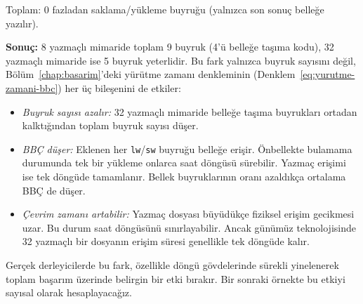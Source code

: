 \begin{ornek}[3.3]
Toplam: 0 fazladan saklama/yükleme buyruğu (yalnızca son sonuç belleğe yazılır).

\medskip
\textbf{Sonuç:} 8 yazmaçlı mimaride toplam 9 buyruk (4'ü belleğe taşıma kodu), 32 yazmaçlı mimaride ise 5 buyruk yeterlidir. Bu fark yalnızca buyruk sayısını değil, Bölüm~\ref{chap:basarim}'deki yürütme zamanı denkleminin (Denklem~\ref{eq:yurutme-zamani-bbc}) her üç bileşenini de etkiler:

\begin{itemize}[nosep]
\item \emph{Buyruk sayısı azalır:} 32 yazmaçlı mimaride belleğe taşıma buyrukları ortadan kalktığından toplam buyruk sayısı düşer.
\item \emph{BBÇ düşer:} Eklenen her \texttt{lw}/\texttt{sw} buyruğu belleğe erişir. Önbellekte bulamama durumunda tek bir yükleme onlarca saat döngüsü sürebilir. Yazmaç erişimi ise tek döngüde tamamlanır. Bellek buyruklarının oranı azaldıkça ortalama BBÇ de düşer.
\item \emph{Çevrim zamanı artabilir:} Yazmaç dosyası büyüdükçe fiziksel erişim gecikmesi uzar. Bu durum saat döngüsünü sınırlayabilir. Ancak günümüz teknolojisinde 32 yazmaçlı bir dosyanın erişim süresi genellikle tek döngüde kalır.
\end{itemize}

Gerçek derleyicilerde bu fark, özellikle döngü gövdelerinde sürekli yinelenerek toplam başarım üzerinde belirgin bir etki bırakır. Bir sonraki örnekte bu etkiyi sayısal olarak hesaplayacağız.
\end{ornek}

